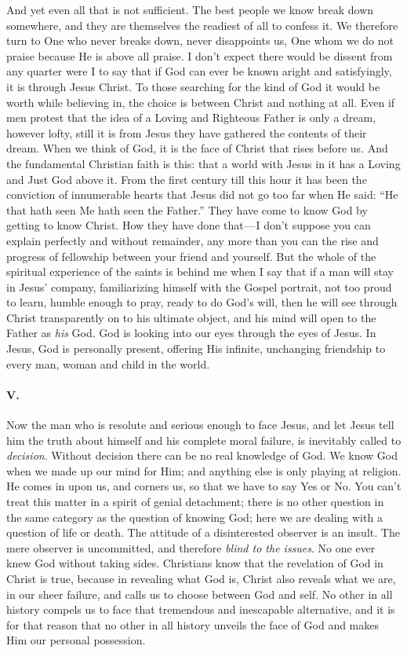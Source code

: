 \documentclass[12pt]{article}
\begin{document}
And yet even all that is not sufficient. The best people we know break
down somewhere, and they are themselves the readiest of all to confess
it. We therefore turn to One who never breaks down, never disappoints
us, One whom we do not praise because He is above all praise. I don't
expect there would be dissent from any quarter were I to say that if God
can ever be known aright and satisfyingly, it is through Jesus Christ.
To those searching for the kind of God it would be worth while believing
in, the choice is between Christ and nothing at all. Even if men protest
that the idea of a Loving and Righteous Father is only a dream, however
lofty, still it is from Jesus they have gathered the contents of their
dream. When we think of God, it is the face of Christ that rises before
us. And the fundamental Christian faith is this: that a world with Jesus
in it has a Loving and Just God above it. From the first century till
this hour it has been the conviction of innumerable hearts that Jesus
did not go too far when He said: ``He that hath seen Me hath seen the
Father.'' They have come to know God by getting to know Christ. How they
have done that --- I don't suppose you can explain perfectly and without
remainder, any more than you can the rise and progress of fellowship
between your friend and yourself. But the whole of the spiritual
experience of the saints is behind me when I say that if a man will stay
in Jesus' company, familiarizing himself with the Gospel portrait, not
too proud to learn, humble enough to pray, ready to do God's will, then
he will see through Christ transparently on to his ultimate object, and
his mind will open to the Father as \emph{his} God. God is looking into
our eyes through the eyes of Jesus. In Jesus, God is personally present,
offering His infinite, unchanging friendship to every man, woman and
child in the world.

\paragraph{V.}\label{bb5e}

Now the man who is resolute and serious enough to face Jesus, and let
Jesus tell him the truth about himself and his complete moral failure,
is inevitably called to \emph{decision}. Without decision there can be
no real knowledge of God. We know God when we made up our mind for Him;
and anything else is only playing at religion. He comes in upon us, and
corners us, so that we have to say Yes or No. You can't treat this
matter in a spirit of genial detachment; there is no other question in
the same category as the question of knowing God; here we are dealing
with a question of life or death. The attitude of a disinterested
observer is an insult. The mere observer is uncommitted, and therefore
\emph{blind to the issues}. No one ever knew God without taking sides.
Christians know that the revelation of God in Christ is true, because in
revealing what God is, Christ also reveals what we are, in our sheer
failure, and calls us to choose between God and self. No other in all
history compels us to face that tremendous and inescapable alternative,
and it is for that reason that no other in all history unveils the face
of God and makes Him our personal possession.
\end{document}
